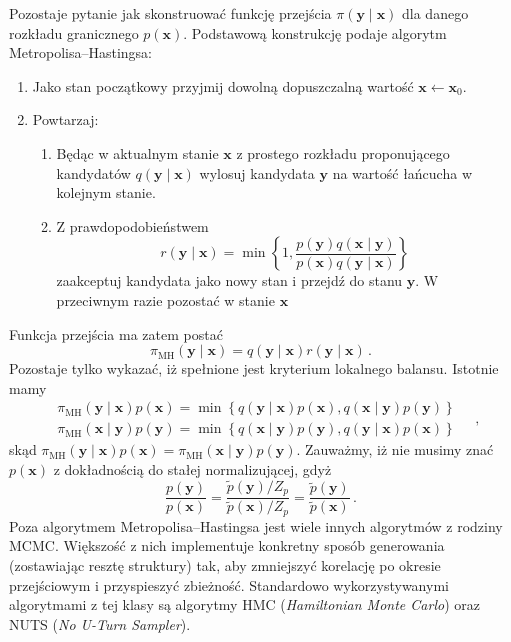 \documentclass{myclass}
\begin{document}
Pozostaje pytanie jak skonstruować funkcję przejścia \(\pi(\mathbf{y} \mid \mathbf{x})\) dla danego
rozkładu granicznego \(p(\mathbf{x})\). Podstawową konstrukcję podaje algorytm
Metropolisa--Hastingsa:
\begin{enumerate}
    \item Jako stan początkowy przyjmij dowolną dopuszczalną wartość \(\mathbf{x} \leftarrow
    \mathbf{x}_0\).
    \item Powtarzaj:
    \begin{enumerate}
        \item Będąc w aktualnym stanie \(\mathbf{x}\) z prostego rozkładu proponującego kandydatów
        \(q(\mathbf{y} \mid \mathbf{x})\) wylosuj kandydata \(\mathbf{y}\) na wartość łańcucha w
        kolejnym stanie.
        \item Z prawdopodobieństwem
        \begin{equation*}
            r(\mathbf{y} \mid \mathbf{x}) = \min\left\{1, \frac{p(\mathbf{y})q(\mathbf{x} \mid \mathbf{y})}{p(\mathbf{x})q(\mathbf{y} \mid \mathbf{x})}\right\}
        \end{equation*}
        zaakceptuj kandydata jako nowy stan i przejdź do stanu \(\mathbf{y}\). W przeciwnym razie
        pozostać w stanie \(\mathbf{x}\)
    \end{enumerate}
\end{enumerate}
Funkcja przejścia ma zatem postać
\begin{equation*}
    \pi_\text{MH}(\mathbf{y}\mid\mathbf{x}) = q(\mathbf{y} \mid \mathbf{x}) r(\mathbf{y} \mid \mathbf{x})\,.
\end{equation*}
Pozostaje tylko wykazać, iż spełnione jest kryterium lokalnego balansu. Istotnie mamy
\begin{equation*}
    \begin{split}
        &\pi_\text{MH}(\mathbf{y}\mid\mathbf{x})p(\mathbf{x}) = \min\left\{q(\mathbf{y}\mid\mathbf{x})p(\mathbf{x}), q(\mathbf{x}\mid\mathbf{y})p(\mathbf{y})\right\}\\
        &\pi_\text{MH}(\mathbf{x}\mid\mathbf{y})p(\mathbf{y}) = \min\left\{q(\mathbf{x}\mid\mathbf{y})p(\mathbf{y}), q(\mathbf{y}\mid\mathbf{x})p(\mathbf{x})\right\}
    \end{split}\quad,
\end{equation*}
skąd \(\pi_\text{MH}(\mathbf{y}\mid\mathbf{x})p(\mathbf{x}) =
\pi_\text{MH}(\mathbf{x}\mid\mathbf{y})p(\mathbf{y})\). Zauważmy, iż nie musimy znać
\(p(\mathbf{x})\) z dokładnością do stałej normalizującej, gdyż
\begin{equation*}
    \frac{p(\mathbf{y})}{p(\mathbf{x})} = \frac{\tilde{p}(\mathbf{y})/Z_p}{\tilde{p}(\mathbf{x})/Z_p} =  \frac{\tilde{p}(\mathbf{y})}{\tilde{p}(\mathbf{x})}\,.
\end{equation*}
Poza algorytmem Metropolisa--Hastingsa jest wiele innych algorytmów z rodziny MCMC. Większość z nich
implementuje konkretny sposób generowania (zostawiając resztę struktury) tak, aby zmniejszyć
korelację po okresie przejściowym i przyspieszyć zbieżność. Standardowo wykorzystywanymi algorytmami
z tej klasy są algorytmy HMC (\textit{Hamiltonian Monte Carlo}) oraz NUTS (\textit{No U-Turn
Sampler}). 
\linesep
\newpage
\end{document}
